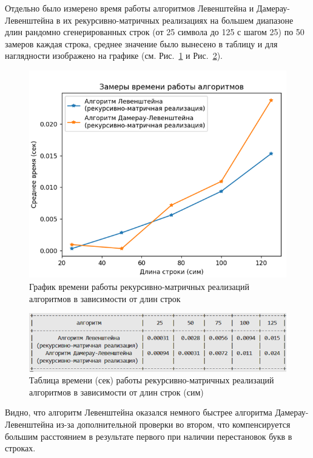 Отдельно было измерено время работы алгоритмов Левенштейна и Дамерау-Левенштейна в их рекурсивно-матричных реализациях на большем диапазоне длин рандомно сгенерированных строк (от 25 символа до 125 с шагом 25) по 50 замеров каждая строка, среднее значение было вынесено в таблицу и для наглядности изображено на графике (см. Рис.~\ref{fig:graph_rec-mat} и Рис.~\ref{fig:table_rec-mat}).

\begin{figure}[H]
    \centering
    \includegraphics[width=1\textwidth]{img/graph_rec-mat.png}
    \caption{График времени работы рекурсивно-матричных реализаций алгоритмов в зависимости от длин строк}
    \label{fig:graph_rec-mat}
\end{figure}

\begin{figure}[H]
    \centering
    \includegraphics[width=1\textwidth]{img/table_rec-mat.png}
    \caption{Таблица времени (сек) работы рекурсивно-матричных реализаций алгоритмов в зависимости от длин строк (сим)}
    \label{fig:table_rec-mat}
\end{figure}

Видно, что алгоритм Левенштейна оказался немного быстрее алгоритма Дамерау-Левенштейна из-за дополнительной проверки во втором, что компенсируется большим расстоянием в результате первого при наличии перестановок букв в строках.

